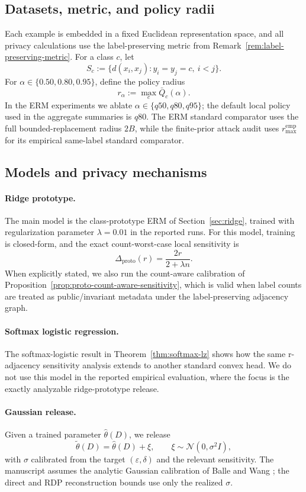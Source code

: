\documentclass[conference,compsoc]{IEEEtran}
\begin{document}
\subsection{Datasets, metric, and policy radii}
Each example is embedded in a fixed Euclidean representation space, and all privacy calculations use the label-preserving metric from Remark~\ref{rem:label-preserving-metric}. For a class $c$, let
\[
S_c:=\{d(x_i,x_j): y_i=y_j=c,\ i<j\}.
\]
For $\alpha\in\{0.50,0.80,0.95\}$, define the policy radius
\[
r_\alpha:=\max_c \bar Q_c(\alpha).
\]
In the ERM experiments we ablate $\alpha\in\{q50,q80,q95\}$; the default local policy used in the aggregate summaries is $q80$. The ERM standard comparator uses the full bounded-replacement radius $2B$, while the finite-prior attack audit uses $r_{\max}^{\mathrm{emp}}$ for its empirical same-label standard comparator.

\subsection{Models and privacy mechanisms}
\paragraph{Ridge prototype.}
The main model is the class-prototype ERM of Section~\ref{sec:ridge}, trained with regularization parameter $\lambda=0.01$ in the reported runs. For this model, training is closed-form, and the exact count-worst-case local sensitivity is
\[
\Delta_{\mathrm{proto}}(r)=\frac{2r}{2+\lambda n}.
\]
When explicitly stated, we also run the count-aware calibration of Proposition~\ref{prop:proto-count-aware-sensitivity}, which is valid when label counts are treated as public/invariant metadata under the label-preserving adjacency graph.

\paragraph{Softmax logistic regression.}
The softmax-logistic result in Theorem~\ref{thm:softmax-lz} shows how the same r-adjacency sensitivity analysis extends to another standard convex head. We do not use this model in the reported empirical evaluation, where the focus is the exactly analyzable ridge-prototype release.

\paragraph{Gaussian release.}
Given a trained parameter $\widehat\theta(D)$, we release
\[
\widetilde\theta(D)=\widehat\theta(D)+\xi,
\qquad
\xi\sim\mathcal{N}(0,\sigma^2 I),
\]
with $\sigma$ calibrated from the target $(\varepsilon,\delta)$ and the relevant sensitivity. The manuscript assumes the analytic Gaussian calibration of Balle and Wang \cite{balle2018analytic}; the direct and RDP reconstruction bounds use only the realized $\sigma$.
\end{document}

